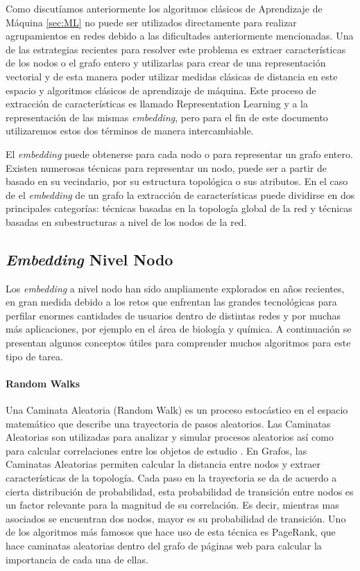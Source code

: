 Como discutíamos anteriormente los algoritmos clásicos de Aprendizaje de Máquina \ref{sec:ML} no puede ser utilizados directamente para realizar agrupamientos en redes debido a las dificultades anteriormente mencionadas. Una de las estrategias recientes para resolver este problema es extraer características de los nodos o el grafo entero y utilizarlas para crear de una representación vectorial y de esta manera poder utilizar medidas clásicas de distancia en este espacio y algoritmos clásicos de aprendizaje de máquina. Este proceso de extracción de características es llamado Representation Learning y a la representación de las mismas \textit{embedding}, pero para el fin de este documento utilizaremos estos dos términos de manera intercambiable.

El \textit{embedding} puede obtenerse para cada nodo o para representar un grafo entero. Existen numerosas técnicas para representar un nodo, puede ser a partir de basado en su vecindario, por su estructura topológica o sus atributos. En el caso de el \textit{embedding} de un grafo la extracción de características puede dividirse en dos principales categorías: técnicas basadas en la topología global de la red y técnicas basadas en subestructuras a nivel de los nodos de la red.

\subsection{\textit{Embedding} Nivel Nodo}

Los \textit{embedding} a nivel nodo han sido ampliamente explorados en años recientes, en gran medida debido a los retos que enfrentan las grandes tecnológicas para perfilar enormes cantidades de usuarios dentro de distintas redes  \cite{lerer_pytorch-biggraph_2019} y por muchas más aplicaciones, por ejemplo en el área de biología y química.
A continuación se presentan algunos conceptos útiles para comprender muchos algoritmos para este tipo de tarea.

\paragraph{Random Walks}
Una Caminata Aleatoria (Random Walk) es un proceso estocástico en el espacio matemático que describe una trayectoria de pasos aleatorios. Las Caminatas Aleatorias son utilizadas para analizar y simular procesos aleatorios así como para calcular correlaciones entre los objetos de estudio \cite{xia_random_2019}. En Grafos, las Caminatas Aleatorias permiten calcular la distancia entre nodos y extraer características de la topología. Cada paso en la trayectoria se da de acuerdo a cierta distribución de probabilidad, esta probabilidad de transición entre nodos es un factor relevante para la magnitud de su correlación. Es decir, mientras mas asociados se encuentran dos nodos, mayor es su probabilidad de transición. Uno de los algoritmos más famosos que hace uso de esta técnica es PageRank, que hace caminatas aleatorias dentro del grafo de páginas web para calcular la importancia de cada una de ellas.


